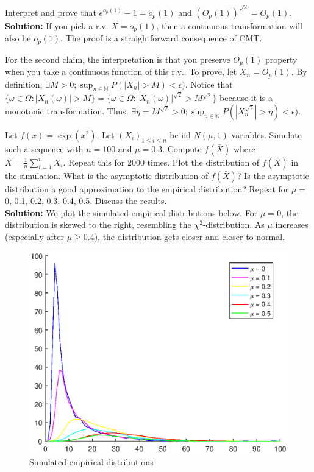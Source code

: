 \documentclass[11pt,letterpaper]{article}                  %
\begin{document}
\bigskip
\begin{problem}
Interpret and prove that $e^{o_p(1)} -1 = o_p(1)$ and $(O_p(1))^{\sqrt{2}} = O_p(1)$. \\

\textbf{Solution:} If you pick a r.v. $X = o_p(1)$, then a continuous transformation will also be $o_p(1)$. The proof is a straightforward consequence of CMT.

For the second claim, the interpretation is that you preserve $O_p(1)$ property when you take a continuous function of this r.v.. To prove, let $X_n = O_p(1)$. By definition, $\exists M>0 ; \sup_{n \in \mathbb{N}} P(|X_n|>M)<\epsilon)$. Notice that $\{\omega \in \Omega : |X_n(\omega)|>M\} = \{\omega \in \Omega : |X_n(\omega)|^{\sqrt{2}}>M^{\sqrt{2}}\}$ because it is a monotonic transformation. Thus, $\exists \eta = M^{\sqrt{2}}>0 ; \sup_{n \in \mathbb{N}} P(|X_n^{\sqrt{2}}|>\eta)<\epsilon)$.
\end{problem}

\bigskip
\begin{problem}
Let $f(x) = \exp (x^2)$.
Let $(X_i)_{1 \leq i \leq n}$ be iid $N(\mu,1)$ variables.
Simulate such a sequence with $n = 100$ and $\mu = 0.3$.
Compute $f (\bar{X})$ where $\bar{X} = \frac{1}{n} \sum_{i=1}^n X_i$.
Repeat this for 2000 times. Plot the distribution of $f (\bar{X})$ in the simulation.
What is the asymptotic distribution of $f (\bar{X})$?
Is the asymptotic distribution a good approximation to the empirical distribution?
Repeat for $\mu =$ 0, 0.1, 0.2, 0.3, 0.4, 0.5.
Discuss the results. \\

\textbf{Solution:}
We plot the simulated empirical distributions below.
For $\mu = 0$, the distribution is skewed to the right, resembling the $\chi^2$-distribution.
As $\mu$ increases (especially after $\mu \geq 0.4$), the distribution gets closer and closer to normal.

\begin{figure}[H]
  \centering
  \caption{Simulated empirical distributions}
  \includegraphics[scale=0.6]{prob12.eps}
\end{figure}
\end{problem}

\bigskip

\begin{problem}

\end{problem}
\end{document}
